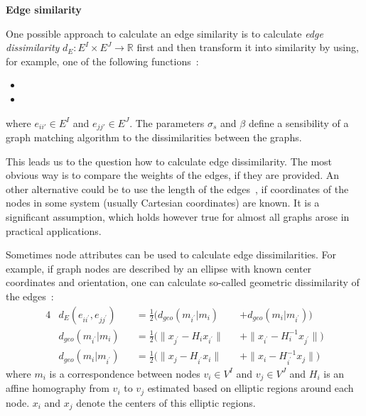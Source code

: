 \textbf{Edge similarity}

One possible approach to calculate an edge similarity is to calculate \emph{edge dissimilarity} $d_E:E^I\times E^J\rightarrow\mathbb{R}$ first and then transform it into similarity by using, for example, one of the following functions~\cite{ Cho2009_AgglClustering, Cho2010_RRWM,Cho2012_ProgressiveGM,Cho2014_Haystack}:
\begin{itemize}
	\item {}
	\item {}
\end{itemize}
where $e_{ii\prime}\in E^I$ and $e_{jj\prime}\in E^J$. The parameters $\sigma_s$ and $\beta$ define a sensibility of a graph matching algorithm to the dissimilarities between the graphs.

This leads us to the question how to calculate edge dissimilarity. The most obvious way is to compare the weights of the edges, if they are provided. An	other alternative could be to use the length of the edges~\cite{Cho2009_AgglClustering, Cho2010_RRWM,Cho2012_ProgressiveGM,Cho2014_Haystack}, if coordinates of the nodes in some system (usually Cartesian coordinates) are known. It is a significant assumption, which holds however true for almost all graphs arose in practical applications.

Sometimes node attributes can be used to calculate edge dissimilarities. For example, if graph nodes are described by an ellipse with known center coordinates and orientation, one can calculate so-called geometric dissimilarity of the edges~\cite{Cho2009_AgglClustering,Cho2012_ProgressiveGM}:
\begin{alignat}{4}\label{eq:geomDiss}
& d_E(e_{ii^\prime},e_{jj^\prime}) && =\frac{1}{2}(d_{geo}(m_{i^\prime}|m_i) && +d_{geo}(m_i|m_{i^\prime})) \\
& d_{geo}(m_{i^\prime}|m_i) && =\frac{1}{2}(\|x_{j^\prime}-H_{i}x_{i^\prime}\| && + \|x_{i^\prime}-H^{-1}_ix_{j^\prime}\|) \\
& d_{geo}(m_i|m_{i^\prime}) && =\frac{1}{2}(\|x_j-H_{i^\prime}x_i\| && + \|x_{i}-H^{-1}_{i^\prime}x_j\|) 
\end{alignat}
where $m_i$ is a correspondence between nodes $v_i\in V^I$ and $v_{j}\in V^J$ and $H_i$ is an affine homography from $v_i$ to $v_{j}$ estimated based on elliptic regions around each node. $x_i$ and $x_{j}$ denote the centers of this elliptic regions.

